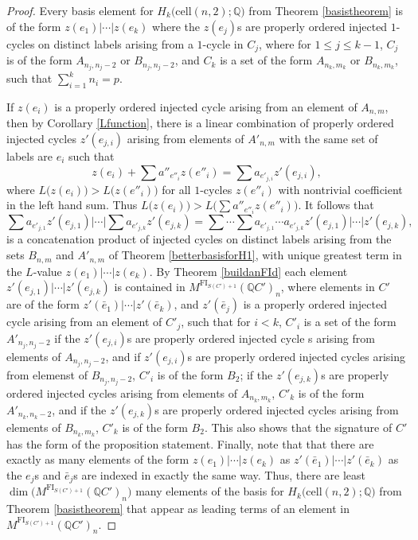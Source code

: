 \documentclass[12py]{amsart}%
\theoremstyle{definition}\newtheorem{definition}[thm]{Definition}
\theoremstyle{definition}
\newcommand{\Q}{\ensuremath{\mathbb{Q}}}
\begin{document}
\begin{proof}
Every basis element for $H_{k}\big(\text{cell}(n,2);\Q\big)$ from Theorem \ref{basistheorem} is of the form $z(e_{1})|\cdots|z(e_{k})$ where the $z(e_{j})$s are properly ordered injected $1$-cycles on distinct labels arising from a $1$-cycle in $C_{j}$, where for $1\le j\le k-1$, $C_{j}$ is of the form $A_{n_{j},n_{j}-2}$ or $B_{n_{j},n_{j}-2}$, and $C_{k}$ is a set of the form $A_{n_{k}, m_{k}}$ or $B_{n_{k}, m_{k}}$, such that $\sum_{i=1}^{k}n_{i}=p$.

If $z(e_{i})$ is a properly ordered injected cycle arising from an element of $A_{n,m}$, then by Corollary \ref{Lfunction}, there is a linear combination of properly ordered injected cycles $z'(e_{j,i})$ arising from elements of $ A'_{n,m}$ with the same set of labels are $e_{i}$ such that 
\[
z(e_{i})+\sum a''_{e''_{i}}z(e''_{i})=\sum a_{e'_{j,i}}z'(e_{j,i}),
\]
where $L\big(z(e_{i})\big)>L\big(z(e''_{i})\big)$ for all $1$-cycles $z(e''_{i})$ with nontrivial coefficient in the left hand sum. Thus $L\big(z(e_{i})\big)>L\big(\sum a''_{e''_{i}}z(e''_{i})\big)$. It follows that
\[
\sum a_{e'_{j,1}}z'(e_{j,1})|\cdots|\sum a_{e'_{j,k}}z'(e_{j,k})=\sum\cdots\sum a_{e'_{j,1}}\cdots a_{e'_{j,k}}z'(e_{j,1})|\cdots|z'(e_{j,k}),
\]
is a concatenation product of injected cycles on distinct labels arising from the sets $B_{n,m}$ and $A'_{n,m}$ of Theorem \ref{betterbasisforH1}, with unique greatest term in the $L$-value $z(e_{1})|\cdots|z(e_{k})$. By Theorem \ref{buildanFId} each element $z'(e_{j,1})|\cdots|z'(e_{j,k})$ is contained in $M^{\text{FI}_{S(C')+1}}(\Q C')_{n}$, where elements in $C'$ are of the form $z'(\bar{e}_{1})|\cdots|z'(\bar{e}_{k})$, and $z'(\bar{e}_{j})$ is a properly ordered injected cycle arising from an element of $C'_{j}$, such that for $i<k$, $C'_{i}$ is a set of the form $A'_{n_{j},n_{j}-2}$ if the $z'(e_{j,i})$s are properly ordered injected cycle s arising from elements of $A_{n_{j},n_{j}-2}$, and if $z'(e_{j,i})$s are properly ordered injected cycles arising from elemenst of $B_{n_{j},n_{j}-2}$, $C'_{i}$ is of the form $B_{2}$; if the $z'(e_{j,k})$s are properly ordered injected cycles arising from elements of $A_{n_{k},m_{k}}$, $C'_{k}$ is of the form $A'_{n_{k},n_{k}-2}$, and if the $z'(e_{j,k})$s are properly ordered injected cycles arising from elements of $B_{n_{k},m_{k}}$, $C'_{k}$ is of the form $B_{2}$. This also shows that the signature of $C'$ has the form of the proposition statement. Finally, note that that there are exactly as many elements of the form $z(e_{1})|\cdots|z(e_{k})$ as $z'(\bar{e}_{1})|\cdots|z'(\bar{e}_{k})$ as the $e_{j}$s and $\bar{e}_{j}$s are indexed in exactly the same way. Thus, there are least $\dim\big(M^{\text{FI}_{S(C')+1}}(\Q C')_{n}\big)$ many elements of the basis for $H_{k}\big(\text{cell}(n,2);\Q\big)$ from Theorem \ref{basistheorem} that appear as leading terms of an element in $M^{\text{FI}_{S(C')+1}}(\Q C')_{n}$.


\end{proof}
\end{document}
